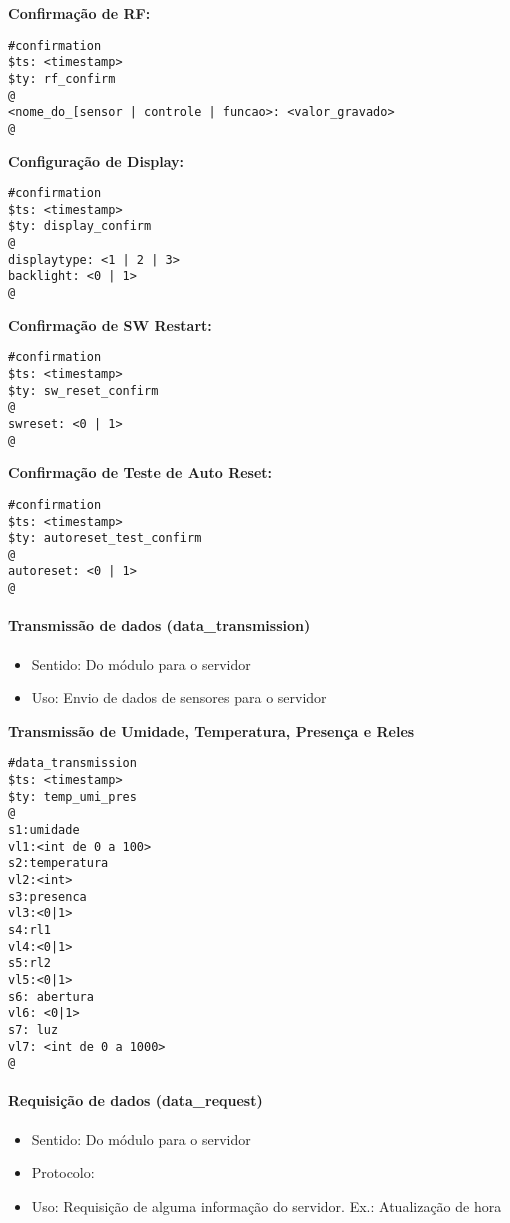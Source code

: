 \textbf{Confirmação de RF:}
\begin{lstlisting}
#confirmation
$ts: <timestamp>
$ty: rf_confirm
@
<nome_do_[sensor | controle | funcao>: <valor_gravado>
@
\end{lstlisting}

\textbf{Configuração de Display:}
\begin{lstlisting}
#confirmation
$ts: <timestamp>
$ty: display_confirm
@
displaytype: <1 | 2 | 3>
backlight: <0 | 1>
@
\end{lstlisting}

\textbf{Confirmação de SW Restart:}
\begin{lstlisting}
#confirmation
$ts: <timestamp>
$ty: sw_reset_confirm
@
swreset: <0 | 1>
@
\end{lstlisting}

\textbf{Confirmação de Teste de Auto Reset:}
\begin{lstlisting}
#confirmation
$ts: <timestamp>
$ty: autoreset_test_confirm
@
autoreset: <0 | 1>
@
\end{lstlisting}

\paragraph{Transmissão de dados (data\_transmission)}
\begin{itemize}
\item Sentido: Do módulo para o servidor
\item Uso: Envio de dados de sensores para o servidor
\end{itemize}

\textbf{Transmissão de Umidade, Temperatura, Presença e Reles}
\begin{lstlisting}
#data_transmission
$ts: <timestamp>
$ty: temp_umi_pres
@
s1:umidade
vl1:<int de 0 a 100>
s2:temperatura
vl2:<int>
s3:presenca
vl3:<0|1>
s4:rl1
vl4:<0|1>
s5:rl2
vl5:<0|1>
s6: abertura
vl6: <0|1>
s7: luz
vl7: <int de 0 a 1000>
@
\end{lstlisting}

\paragraph{Requisição de dados (data\_request)}
\begin{itemize}
\item Sentido: Do módulo para o servidor
\item Protocolo: \wmqtt{}
\item Uso: Requisição de alguma informação do servidor. Ex.: Atualização de hora
\end{itemize}


